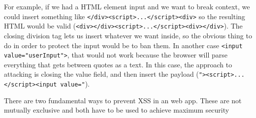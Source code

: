 For example, if we had a HTML element input  and we want to break context, we could insert something like \verb|</div><script>...</script><div>| so the resulting HTML would be valid (\verb|<div></div><script>...</script><div></div>|). The closing division tag lets us insert whatever we want inside, so the obvious thing to do in order to protect the input would be to ban them. In another case \verb|<input value="userInput">|, that would not work because the browser will parse everything that gets between quotes as a text. In this case, the approach to attacking is closing the value field, and then insert the payload (\verb|"><script>...</script><input value="|).

There are two fundamental ways to prevent XSS in an web app. These are not mutually exclusive and both have to be used to achieve maximum security
\subsubsection{}


